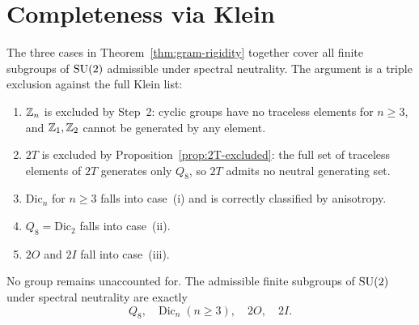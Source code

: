 \section{Completeness via Klein}
  \label{sec:klein}

  The three cases in Theorem~\ref{thm:gram-rigidity} together cover all finite subgroups
  of $\mathrm{SU}(2)$ admissible under spectral neutrality.
  The argument is a triple exclusion against the full Klein list:
  \begin{enumerate}
    \item $\mathbb{Z}_n$ is excluded by Step~2: cyclic groups have no traceless elements for $n \ge 3$,
    and $\mathbb{Z}_1, \mathbb{Z}_2$ cannot be generated by any element.
    \item $2T$ is excluded by Proposition~\ref{prop:2T-excluded}: the full set of
    traceless elements of $2T$ generates only $Q_8$, so $2T$ admits no neutral
    generating set.
    \item $\mathrm{Dic}_n$ for $n \ge 3$ falls into case~(i) and is correctly
    classified by anisotropy.
    \item $Q_8 = \mathrm{Dic}_2$ falls into case~(ii).
    \item $2O$ and $2I$ fall into case~(iii).
  \end{enumerate}
  No group remains unaccounted for.
  The admissible finite subgroups of $\mathrm{SU}(2)$ under spectral neutrality are exactly
  \begin{equation}
    Q_8,\quad \mathrm{Dic}_n\;(n \ge 3),\quad 2O,\quad 2I.
    \label{eq:admissible-list}
  \end{equation}
